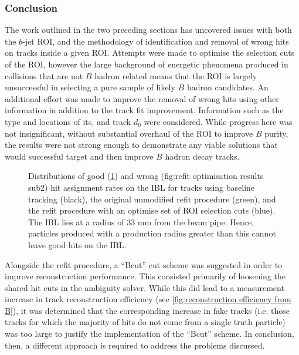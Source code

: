 \subsubsection{Conclusion}
The work outlined in the two preceding sections has uncovered issues with both the $b$-jet ROI, and the methodology of identification and removal of wrong hits on tracks inside a given ROI. Attempts were made to optimise the selection cuts of the ROI, however the large background of energetic phenomena produced in collisions that are not $B$ hadron related means that the ROI is largely unsuccessful in selecting a pure sample of likely $B$ hadron candidates. An additional effort was made to improve the removal of wrong hits using other information in addition to the track fit improvement. Information such as the type and locations of its, and track $d_0$ were considered. While progress here was not insignificant, without substantial overhaul of the ROI to improve $B$ purity, the results were not strong enough to demonstrate any viable solutions that would successful target and then improve $B$ hadron decay tracks.
%
\begin{figure}[!htbp]
    \centering
    \begin{subfigure}{.5\textwidth}
      \centering
      \caption{}
      \label{fig:refit optimisation results sub1}
    \end{subfigure}%
    \begin{subfigure}{.5\textwidth}
      \centering
      \caption{}
      \label{fig:refit optimisation results sub2}
    \end{subfigure}
    \caption{Distributions of good (\cref{fig:refit optimisation results sub1}) and wrong (fig:refit optimisation results sub2) hit assignment rates on the IBL for tracks using baseline tracking (black), the original unmodified refit procedure (green), and the refit procedure with an optimise set of ROI selection cuts (blue). The IBL lies at a radius of 33 mm from the beam pipe. Hence, particles produced with a production radius greater than this cannot leave good hits on the IBL.}
    \label{fig:refit optimisation results}
\end{figure}
%
Alongside the refit procedure, a ``Bcut'' cut scheme was suggested in order to improve reconstruction performance. This consisted primarily of loosening the shared hit cuts in the ambiguity solver. While this did lead to a measurement increase in track reconstruction efficiency (see \cref{fig:reconstruction efficiency from B}), it was determined that the corresponding increase in fake tracks (i.e. those tracks for which the majority of hits do not come from a single truth particle) was too large to justify the implementation of the ``Bcut'' scheme. In conclusion, then, a different approach is required to address the problems discussed.



